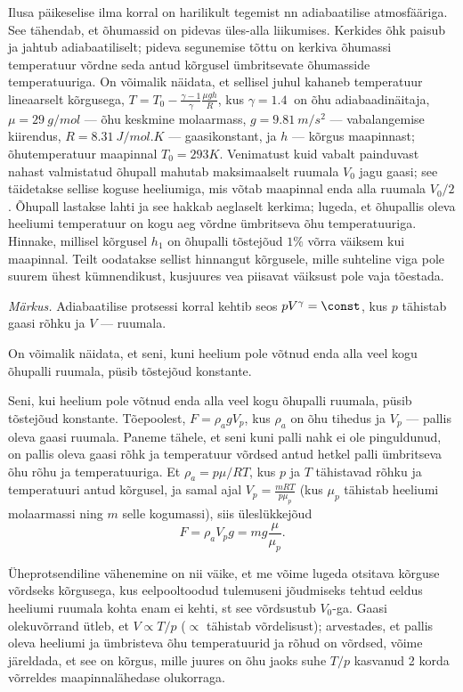 
Ilusa päikeselise ilma korral on harilikult tegemist nn adiabaatilise atmosfääriga. See tähendab, et õhumassid on pidevas üles-alla liikumises. Kerkides õhk paisub ja jahtub adiabaatiliselt; pideva segunemise tõttu on kerkiva õhumassi temperatuur võrdne seda antud kõrgusel ümbritsevate õhumasside temperatuuriga. On võimalik näidata, et sellisel juhul kahaneb temperatuur lineaarselt kõrgusega, $T=T_0-\frac{\gamma-1}\gamma\frac{\mu g h}R$, kus $\gamma=\SI{1.4}{	}$ on õhu adiabaadinäitaja, $\mu=\SI{29}{g/mol}$ --- õhu keskmine molaarmass, $g=\SI{9.81}{m/s^2}$ --- vabalangemise kiirendus, $R=\SI{8.31}{J/mol.K}$ --- gaasikonstant, ja $h$ --- kõrgus maapinnast; õhutemperatuur maapinnal $T_0=\SI{293}K$. Venimatust kuid vabalt painduvast nahast valmistatud õhupall mahutab maksimaalselt ruumala $V_0$ jagu gaasi; see täidetakse sellise koguse heeliumiga, mis võtab maapinnal enda alla ruumala $V_0/2$. Õhupall lastakse lahti ja see hakkab aeglaselt kerkima; lugeda, et õhupallis oleva heeliumi temperatuur on kogu aeg võrdne ümbritseva õhu temperatuuriga. Hinnake, millisel kõrgusel $h_1$ on õhupalli tõstejõud $1\%$ võrra väiksem kui maapinnal. Teilt oodatakse sellist hinnangut kõrgusele, mille suhteline viga pole suurem ühest kümnendikust, kusjuures vea piisavat väiksust pole vaja tõestada. 

\emph{Märkus.} Adiabaatilise protsessi korral kehtib seos $pV^\gamma = \const$, kus $p$ tähistab gaasi rõhku ja $V$ --- ruumala.

\hint
On võimalik näidata, et seni, kuni heelium pole võtnud enda alla veel kogu õhupalli ruumala, püsib tõstejõud konstante.

\solu
Seni, kui heelium pole võtnud enda alla veel kogu õhupalli ruumala, püsib tõstejõud konstante. Tõepoolest, $F=\rho_a g V_p$, kus $\rho_a$ on õhu tihedus ja $V_p$ --- pallis oleva gaasi ruumala. Paneme tähele, et seni kuni palli nahk ei ole pinguldunud, on pallis oleva gaasi rõhk ja temperatuur võrdsed antud hetkel palli ümbritseva õhu rõhu ja temperatuuriga. Et $\rho_a=p\mu/RT$, kus $p$ ja $T$ tähistavad rõhku ja temperatuuri antud kõrgusel, ja samal ajal $V_p=\frac {mRT}{p\mu_p}$ (kus $\mu_p$ tähistab heeliumi molaarmassi ning $m$ selle kogumassi), siis üleslükkejõud
\[
F=\rho_a V_p g=mg\frac{\mu}{\mu_p}.
\]

Üheprotsendiline vähenemine on nii väike, et me võime lugeda otsitava kõrguse võrdseks kõrgusega, kus eelpooltoodud tulemuseni jõudmiseks tehtud eeldus heeliumi ruumala kohta enam ei kehti, st see võrdsustub $V_0$-ga. Gaasi olekuvõrrand ütleb, et $V\propto T/p$ ($\propto$ tähistab võrdelisust); arvestades, et pallis oleva heeliumi ja ümbristeva õhu temperatuurid ja rõhud on võrdsed, võime järeldada, et see on kõrgus, mille juures on õhu jaoks suhe $T/p$ kasvanud 2 korda võrreldes maapinnalähedase olukorraga. 

